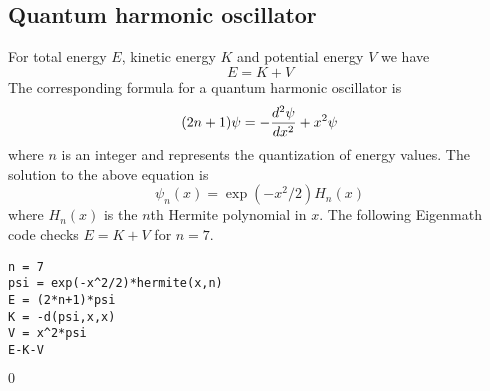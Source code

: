 
\subsection{Quantum harmonic oscillator}
For total energy $E$, kinetic energy $K$ and potential energy $V$ we have
$$E=K+V$$
The corresponding formula for a quantum harmonic oscillator is
$$(2n+1)\psi=-{d^2\psi\over dx^2}+x^2\psi$$
where $n$ is an integer and represents the quantization of energy values.
The solution to the above equation is
$$\psi_n(x)=\exp(-x^2/2)H_n(x)$$
where $H_n(x)$ is the $n$th Hermite polynomial in $x$.
The following Eigenmath code checks $E=K+V$ for $n=7$.

\begin{Verbatim}[formatcom=\color{blue},samepage=true]
n = 7
psi = exp(-x^2/2)*hermite(x,n)
E = (2*n+1)*psi
K = -d(psi,x,x)
V = x^2*psi
E-K-V
\end{Verbatim}

$\displaystyle 0$
